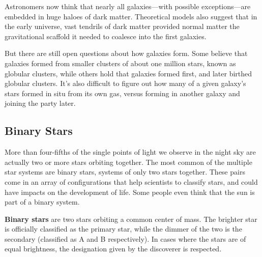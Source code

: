 \documentclass{article}
\begin{document}
Astronomers now think that nearly all galaxies—with possible exceptions—are embedded in huge haloes of dark matter. Theoretical models also suggest that in the early universe, vast tendrils of dark matter provided normal matter the gravitational scaffold it needed to coalesce into the first galaxies.

But there are still open questions about how galaxies form. Some believe that galaxies formed from smaller clusters of about one million stars, known as globular clusters, while others hold that galaxies formed first, and later birthed globular clusters. It's also difficult to figure out how many of a given galaxy's stars formed in situ from its own gas, versus forming in another galaxy and joining the party later.
\subsection{Binary Stars}
More than four-fifths of the single points of light we observe in the night sky are actually two or more stars orbiting together. The most common of the multiple star systems are binary stars, systems of only two stars together. These pairs come in an array of configurations that help scientists to classify stars, and could have impacts on the development of life. Some people even think that the sun is part of a binary system.
\par
\textbf{Binary stars} are two stars orbiting a common center of mass. The brighter star is officially classified as the primary star, while the dimmer of the two is the secondary (classified as A and B respectively). In cases where the stars are of equal brightness, the designation given by the discoverer is respected.
\end{document}

